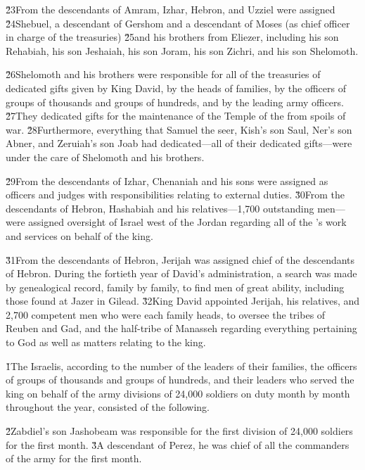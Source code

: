 \v{23}From the descendants of Amram, Izhar, Hebron, and Uzziel were assigned \v{24}Shebuel, a descendant of Gershom and a descendant of Moses (as chief officer in charge of the treasuries) \v{25}and his brothers from Eliezer, including his son Rehabiah, his son Jeshaiah, his son Joram, his son Zichri, and his son Shelomoth.

\v{26}Shelomoth and his brothers were responsible for all of the treasuries of dedicated gifts given by King David, by the heads of families, by the officers of groups of thousands and groups of hundreds, and by the leading army officers. \v{27}They dedicated gifts for the maintenance of the Temple of the  from spoils of war. \v{28}Furthermore, everything that Samuel the seer, Kish's son Saul, Ner's son Abner, and Zeruiah's son Joab had dedicated---all of their dedicated gifts---were under the care of Shelomoth and his brothers.

\v{29}From the descendants of Izhar, Chenaniah and his sons were assigned as officers and judges with responsibilities relating to external duties. \v{30}From the descendants of Hebron, Hashabiah and his relatives---1,700 outstanding men---were assigned oversight of Israel west of the Jordan regarding all of the 's work and services on behalf of the king.

\v{31}From the descendants of Hebron, Jerijah was assigned chief of the descendants of Hebron. During the fortieth year of David's administration, a search was made by genealogical record, family by family, to find men of great ability, including those found at Jazer in Gilead. \v{32}King David appointed Jerijah, his relatives, and 2,700 competent men who were each family heads, to oversee the tribes of Reuben and Gad, and the half-tribe of Manasseh regarding everything pertaining to God as well as matters relating to the king.

\v{1}The Israelis, according to the number of the leaders of their families, the officers of groups of thousands and groups of hundreds, and their leaders who served the king on behalf of the army divisions of 24,000 soldiers on duty month by month throughout the year, consisted of the following.

\v{2}Zabdiel's son Jashobeam was responsible for the first division of 24,000 soldiers for the first month. \v{3}A descendant of Perez, he was chief of all the commanders of the army for the first month.

